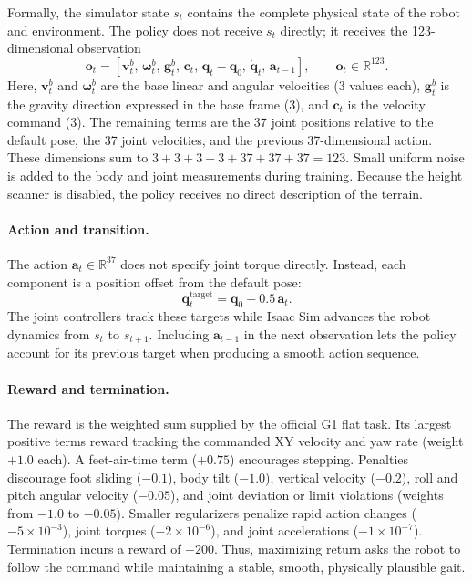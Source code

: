 \documentclass[11pt,a4paper]{article}
\begin{document}
Formally, the simulator state $s_t$ contains the complete physical state of the
robot and environment. The policy does not receive $s_t$ directly; it receives
the 123-dimensional observation
\[
\mathbf{o}_t =
\left[
\mathbf{v}^{b}_t,\,
\boldsymbol{\omega}^{b}_t,\,
\mathbf{g}^{b}_t,\,
\mathbf{c}_t,\,
\mathbf{q}_t-\mathbf{q}_{0},\,
\dot{\mathbf{q}}_t,\,
\mathbf{a}_{t-1}
\right],
\qquad \mathbf{o}_t\in\mathbb{R}^{123}.
\]
Here, $\mathbf{v}^{b}_t$ and $\boldsymbol{\omega}^{b}_t$ are the base linear
and angular velocities (3 values each), $\mathbf{g}^{b}_t$ is the gravity
direction expressed in the base frame (3), and $\mathbf{c}_t$ is the velocity
command (3). The remaining terms are the 37 joint positions relative to the
default pose, the 37 joint velocities, and the previous 37-dimensional action.
These dimensions sum to $3+3+3+3+37+37+37=123$. Small uniform noise is added
to the body and joint measurements during training. Because the height scanner
is disabled, the policy receives no direct description of the terrain.

\paragraph{Action and transition.}
The action $\mathbf{a}_t\in\mathbb{R}^{37}$ does not specify joint torque
directly. Instead, each component is a position offset from the default pose:
\[
\mathbf{q}^{\mathrm{target}}_t
=\mathbf{q}_{0}+0.5\,\mathbf{a}_t.
\]
The joint controllers track these targets while Isaac Sim advances the robot
dynamics from $s_t$ to $s_{t+1}$. Including $\mathbf{a}_{t-1}$ in the next
observation lets the policy account for its previous target when producing a
smooth action sequence.

\paragraph{Reward and termination.}
The reward is the weighted sum supplied by the official G1 flat task. Its
largest positive terms reward tracking the commanded XY velocity and yaw rate
(weight $+1.0$ each). A feet-air-time term ($+0.75$) encourages stepping.
Penalties discourage foot sliding ($-0.1$), body tilt ($-1.0$), vertical
velocity ($-0.2$), roll and pitch angular velocity ($-0.05$), and joint
deviation or limit violations (weights from $-1.0$ to $-0.05$). Smaller
regularizers penalize rapid action changes
($-5{\times}10^{-3}$), joint torques ($-2{\times}10^{-6}$), and joint
accelerations ($-1{\times}10^{-7}$). Termination incurs a reward of $-200$.
Thus, maximizing return asks the robot to follow the command while maintaining
a stable, smooth, physically plausible gait.
\end{document}
